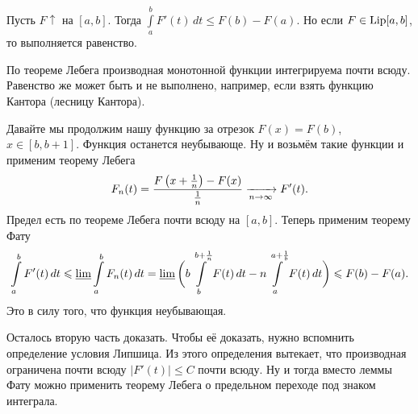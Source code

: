 \begin{Lem}
  Пусть $F\uparrow$ на $[a,b]$. Тогда $\int\limits_a^b F'(t)\,dt\le F(b)-F(a)$. Но если $F\in \Lip[a,b]$, то выполняется равенство.
\end{Lem}
По теореме Лебега производная монотонной функции интегрируема почти всюду. Равенство же может быть и не выполнено, например, если взять функцию Кантора (лесницу Кантора).
\begin{Proof}
  Давайте мы продолжим нашу функцию за отрезок $F(x)=F(b)$, $x\in[b,b+1]$. Функция останется неубывающе. Ну и возьмём такие функции и применим теорему Лебега
\[
  F_n(t) = \frac{F\left(x+\frac1n\right)-F(x)}{\frac1n}\te F'(t).
\]
Предел есть по теореме Лебега почти всюду на $[a,b]$. Теперь применим теорему Фату
\[
  \int\limits_a^bF'(t)\,dt\le \varliminf\int\limits_a^b F_n(t)\,dt = 
  \varliminf \bigg(b\int\limits_b^{b+\frac1n}F(t)\,dt - n\int\limits_a^{a+\frac1b}F(t)\,dt\bigg)\le F(b)-F(a).
\]
Это в силу того, что функция неубывающая.

Осталось вторую часть доказать. Чтобы её доказать, нужно вспомнить определение условия Липшица. Из этого определения вытекает, что производная ограничена почти всюду $\big|F'(t)\big|\le C$ почти всюду. Ну и тогда вместо леммы Фату можно применить теорему Лебега о предельном переходе под знаком интеграла.
\end{Proof}

